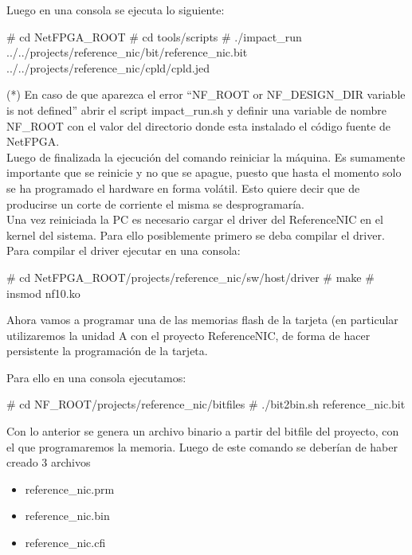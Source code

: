 Luego en una consola se ejecuta lo siguiente:

\begin{bash}
# cd NetFPGA_ROOT
# cd tools/scripts
# ./impact_run 
  ../../projects/reference_nic/bit/reference_nic.bit 
  ../../projects/reference_nic/cpld/cpld.jed 
\end{bash}

(*) En caso de que aparezca el error “NF\_ROOT or NF\_DESIGN\_DIR variable is not defined”
abrir el script impact\_run.sh y definir una variable de nombre NF\_ROOT con el valor del directorio donde esta instalado el código fuente de NetFPGA.\\

Luego de finalizada la ejecución del comando reiniciar la máquina. Es sumamente importante que se reinicie y no que se apague, puesto que hasta el momento solo se ha programado el hardware en forma volátil. Esto quiere decir que de producirse un corte de corriente el misma se desprogramaría.\\

Una vez reiniciada la PC es necesario cargar el driver del ReferenceNIC en el kernel del sistema. Para ello posiblemente primero se deba compilar el driver. Para compilar el driver ejecutar en una consola:\\

\begin{bash}
# cd NetFPGA_ROOT/projects/reference_nic/sw/host/driver
# make
# insmod nf10.ko
\end{bash}

Ahora vamos a programar una de las memorias flash de la tarjeta (en particular utilizaremos la unidad A con el proyecto ReferenceNIC, de forma de hacer persistente la programación de la tarjeta.

Para ello en una consola ejecutamos:

\begin{bash}
# cd NF_ROOT/projects/reference_nic/bitfiles
# ./bit2bin.sh reference_nic.bit
\end{bash}

Con lo anterior se genera un archivo binario a partir del bitfile del proyecto, con el que programaremos la memoria. Luego de este comando se deberían de haber creado 3 archivos

\begin{itemize}
\item reference\_nic.prm
\item reference\_nic.bin
\item reference\_nic.cfi
\end{itemize}

